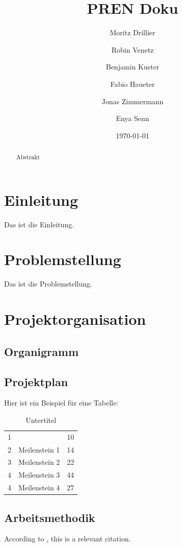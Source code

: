 \documentclass{article}
\title{PREN Doku}
\author{Moritz Drillier \and Robin Venetz \and Benjamin Kuster \and Fabio Haueter \and Jonas Zimmermann \and Enya Senn}
\date{\thedate}
\begin{document}
\maketitle

\tableofcontents 

\begin{abstract}
Abstrakt
\end{abstract}

\section{Einleitung}
Das ist die Einleitung.
\section{Problemstellung}
Das ist die Problemstellung.
\section{Projektorganisation}

\subsection{Organigramm}

\subsection{Projektplan}
Hier ist ein Beispiel für eine Tabelle:

\begin{table}[H] %
    \centering
    \begin{tabular}{clr}
        1 & \date{\today} & 10 \\
        2 & Meilenstein 1 & 14 \\
        3 & Meilenstein 2  & 22 \\
        4 & Meilenstein 3  & 44 \\
        4 & Meilenstein 4  & 27 \\
    \end{tabular}
    \caption{Untertitel}
    \label{tab:my_label}
\end{table}

\subsection{Arbeitsmethodik}
According to \cite{sampleReference}, this is a relevant citation.
\end{document}
